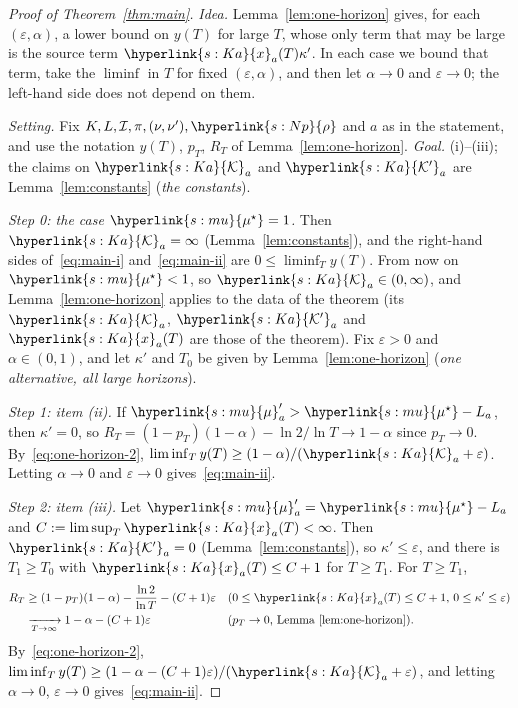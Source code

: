 \documentclass[11pt]{article}
\newcommand{\sy}[2]{\hyperlink{#1}{#2}}
\newcommand{\mean}{\sy{s:mu}{\mu}}
\newcommand{\ms}{\sy{s:mu}{\mu^{\star}}}
\newcommand{\rhos}{\sy{s:Np}{\rho}}
\newcommand{\Ka}{\sy{s:Ka}{\mathcal{K}}}
\newcommand{\Kp}{\sy{s:Ka}{\mathcal{K}'}}
\newcommand{\xr}{\sy{s:Ka}{x}}
\begin{document}
\begin{proof}[Proof of Theorem~\ref{thm:main}]
\emph{Idea.} Lemma~\ref{lem:one-horizon} gives, for each $(\varepsilon,\alpha)$, a lower bound on
$y(T)$ for large $T$, whose only term that may be large is the source term $\xr_a(T)\kappa'$. In each
case we bound that term, take the $\liminf$ in $T$ for fixed $(\varepsilon,\alpha)$, and then let
$\alpha\to0$ and $\varepsilon\to0$; the left-hand side does not depend on them.

\emph{Setting.} Fix $K,L,\mathcal I,\pi,(\nu,\nu'),\rhos$ and $a$ as in the statement, and use the
notation $y(T)$, $p_T$, $R_T$ of Lemma~\ref{lem:one-horizon}. \emph{Goal.} (i)--(iii); the claims
on $\Ka_a$ and $\Kp_a$ are Lemma~\ref{lem:constants} (\emph{the constants}).

\emph{Step 0: the case $\ms=1$.} Then $\Ka_a=\infty$ (Lemma~\ref{lem:constants}), and the right-hand
sides of~\eqref{eq:main-i} and~\eqref{eq:main-ii} are $0\le\liminf_Ty(T)$. From now on $\ms<1$, so
$\Ka_a\in(0,\infty)$, and Lemma~\ref{lem:one-horizon} applies to the data of the theorem (its
$\Ka_a$, $\Kp_a$ and $\xr_a(T)$ are those of the theorem). Fix $\varepsilon>0$ and
$\alpha\in(0,1)$, and let $\kappa'$ and $T_0$ be given by Lemma~\ref{lem:one-horizon} (\emph{one
alternative, all large horizons}).

\emph{Step 1: item (ii).} If $\mean'_a>\ms-L_a$, then $\kappa'=0$, so
$R_T=(1-p_T)(1-\alpha)-\ln2/\ln T\to1-\alpha$ since $p_T\to0$. By~\eqref{eq:one-horizon-2},
$\liminf_Ty(T)\ge(1-\alpha)/(\Ka_a+\varepsilon)$. Letting $\alpha\to0$ and $\varepsilon\to0$
gives~\eqref{eq:main-ii}.

\emph{Step 2: item (iii).} Let $\mean'_a=\ms-L_a$ and $C:=\limsup_T\xr_a(T)<\infty$. Then
$\Kp_a=0$ (Lemma~\ref{lem:constants}), so $\kappa'\le\varepsilon$, and there is $T_1\ge T_0$ with
$\xr_a(T)\le C+1$ for $T\ge T_1$. For $T\ge T_1$,
\begin{align*}
R_T&\ge(1-p_T)(1-\alpha)-\frac{\ln2}{\ln T}-(C+1)\varepsilon
&&\text{($0\le\xr_a(T)\le C+1$, $0\le\kappa'\le\varepsilon$)}\\
&\xrightarrow[T\to\infty]{}1-\alpha-(C+1)\varepsilon &&\text{($p_T\to0$, Lemma~\ref{lem:one-horizon})}.
\end{align*}
By~\eqref{eq:one-horizon-2}, $\liminf_Ty(T)\ge(1-\alpha-(C+1)\varepsilon)/(\Ka_a+\varepsilon)$, and
letting $\alpha\to0$, $\varepsilon\to0$ gives~\eqref{eq:main-ii}.


\end{proof}
\end{document}
